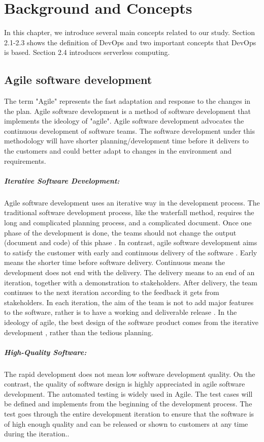 \chapter{Background and Concepts}
In this chapter, we introduce several main concepts related to our study. Section 2.1-2.3 shows the definition of DevOps and two important concepts that DevOps is based. Section 2.4 introduces serverless computing.
\section{Agile software development}
\label{agile}
The term "Agile" represents the fast adaptation and response to the changes in the plan\cite{highsmith2002agile}.
Agile software development is a method of software development that implements the ideology of "agile". Agile software development advocates the continuous development of software teams. The software development under this methodology will have shorter planning/development time before it delivers to the customers and could better adapt to changes in the environment and requirements.
\paragraph{Iterative Software Development:} Agile software development uses an iterative way in the development process. The traditional software development process, like the waterfall method, requires the long and complicated planning process, and a complicated document. Once one phase of the development is done, the teams should not change the output (document and code) of this phase \cite{cusumano1995beyond}. In contrast, agile software development aims to satisfy the customer with early and continuous delivery of the software \cite{beck2001manifesto}. Early means the shorter time before software delivery. Continuous means the development does not end with the delivery. The delivery means to an end of an iteration, together with a demonstration to stakeholders. After delivery, the team continues to the next iteration according to the feedback it gets from stakeholders. In each iteration, the aim of the team is not to add major features to the software, rather is to have a working and deliverable release \cite{beck1999embracing}. In the ideology of agile, the best design of the software product comes from the iterative development \cite{beck2001manifesto}, rather than the tedious planning. 

\paragraph{High-Quality Software:} The rapid development does not mean low software development quality. On the contrast, the quality of software design is highly appreciated in agile software development. The automated testing is widely used in Agile. The test cases will be defined and implements from the beginning of the development process. The test goes through the entire development iteration to ensure that the software is of high enough quality and can be released or shown to customers at any time during the iteration.\cite{Agilesof32:online}.
